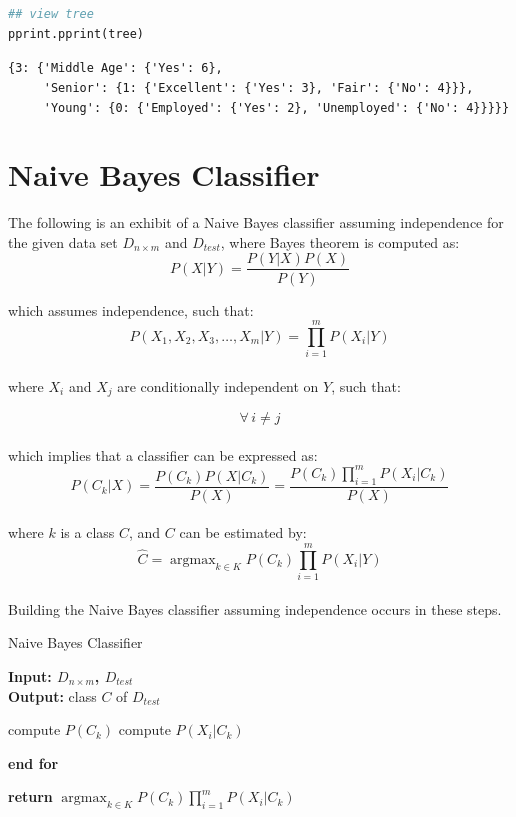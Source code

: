 \documentclass{article}
\DeclareMathOperator*{\argmax}{argmax} %
\begin{document}
\begin{lstlisting}[language=Python, title=Python 3: Decision Tree]
## view tree
pprint.pprint(tree)\end{lstlisting}
\verb|{3: {'Middle Age': {'Yes': 6}, |\\
\verb|     'Senior': {1: {'Excellent': {'Yes': 3}, 'Fair': {'No': 4}}}, |\\
\verb|     'Young': {0: {'Employed': {'Yes': 2}, 'Unemployed': {'No': 4}}}}} |\\

\break

\section*{Naive Bayes Classifier}
The following is an exhibit of a Naive Bayes classifier assuming independence for the given data set $D_{n \times m}$ and $D_{test}$, where Bayes theorem is computed as:\\
 
\begin{equation}
    P(X|Y) = \frac{P(Y|X) P(X)}{P(Y)}
\end{equation}

which assumes independence, such that:
\begin{equation}
    P(X_1, X_2, X_3, \ldots, X_m|Y) = \prod_{i = 1}^{m} P(X_i|Y)
\end{equation}\\

where $X_i$ and $X_j$ are conditionally independent on $Y$, such that:

\begin{equation}
    \forall \, i \neq j
\end{equation}\\
which implies that a classifier can be expressed as:
\begin{equation}
    P(C_k | X) = \frac{P(C_k)P(X|C_k)}{P(X)} = \frac{P(C_k) \prod_{i = 1}^{m} P(X_i|C_k)}{P(X)}
\end{equation}\\

where $k$ is a class $C$, and $C$ can be estimated by:\\
\begin{equation}
    \hat{C} = \argmax_{k \in K} P(C_k) \prod_{i = 1}^{m} P(X_i|Y)
\end{equation}\\

Building the Naive Bayes classifier assuming independence occurs in these steps.
\begin{algorithm}
\caption{Naive Bayes Classifier}
\textbf{Input: $D_{n \times m}$, $D_{test}$}\\
\textbf{Output:} class $C$ of $D_{test}$
\begin{algorithmic}[1]
        \STATE compute $P(C_k)$
            \STATE compute $P(X_i|C_k)$
        \ENDFOR
    \item \textbf{end for}
    \item \textbf{return} $\argmax_{k\in K}P(C_k)\prod_{i=1}^{m}P(X_i|C_k)$
\end{algorithmic}
\end{algorithm}
\end{document}
